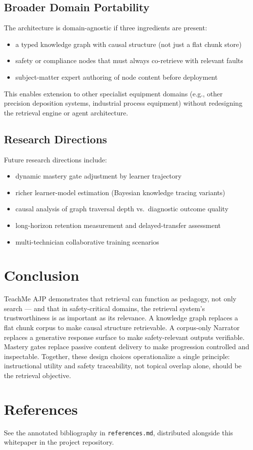 \documentclass[11pt,letterpaper]{article}
\begin{document}
\subsection{Broader Domain Portability}
The architecture is domain-agnostic if three ingredients are present:
\begin{itemize}
  \item a typed knowledge graph with causal structure (not just a flat chunk store)
  \item safety or compliance nodes that must always co-retrieve with relevant faults
  \item subject-matter expert authoring of node content before deployment
\end{itemize}

This enables extension to other specialist equipment domains (e.g., other precision deposition systems, industrial process equipment) without redesigning the retrieval engine or agent architecture.

\subsection{Research Directions}
Future research directions include:
\begin{itemize}
  \item dynamic mastery gate adjustment by learner trajectory
  \item richer learner-model estimation (Bayesian knowledge tracing variants)
  \item causal analysis of graph traversal depth vs.\ diagnostic outcome quality
  \item long-horizon retention measurement and delayed-transfer assessment
  \item multi-technician collaborative training scenarios
\end{itemize}

\section{Conclusion}
\label{sec:conclusion}

TeachMe AJP demonstrates that retrieval can function as pedagogy, not only search --- and that in safety-critical domains, the retrieval system's trustworthiness is as important as its relevance. A knowledge graph replaces a flat chunk corpus to make causal structure retrievable. A corpus-only Narrator replaces a generative response surface to make safety-relevant outputs verifiable. Mastery gates replace passive content delivery to make progression controlled and inspectable. Together, these design choices operationalize a single principle: instructional utility and safety traceability, not topical overlap alone, should be the retrieval objective.

\section{References}
\label{sec:references}

See the annotated bibliography in \texttt{references.md}, distributed alongside this whitepaper in the project repository.
\end{document}
